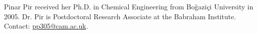 \documentclass[journal,transmag]{IEEEtran}
\begin{document}
\begin{IEEEbiography}{Pinar Pir}
received her Ph.D. in Chemical Engineering from Bo\v{g}azi\c{c}i University in 2005. 
Dr. Pir is Postdoctoral Research Associate at the Babraham Institute.
Contact: \href{mailto:pp305@cam.ac.uk}{pp305@cam.ac.uk}.
\end{IEEEbiography}


\vfill


\end{document}
